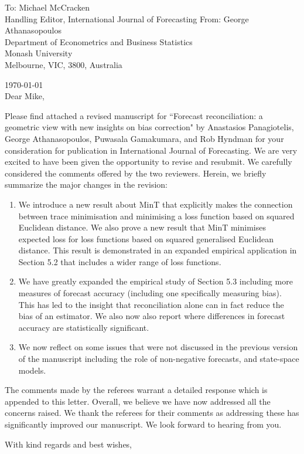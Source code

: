 \documentclass[11pt,a4paper]{letter}
\date{}
\begin{document}
 \begin{letter}{To: Michael McCracken\\
 	Handling Editor, International Journal of Forecasting
    }
    From: George Athanasopoulos\\
    Department of Econometrics and Business Statistics\\
    Monash University\\
    Melbourne, VIC, 3800, Australia

 \opening{\today\ \\Dear Mike,}
 \medskip

Please find attached a revised manuscript for ``Forecast reconciliation: a geometric view with new insights on bias correction" by Anastasios Panagiotelis, George Athanasopoulos, Puwasala Gamakumara, and Rob Hyndman for your consideration for publication in International Journal of Forecasting. We are very excited to have been given the opportunity to revise and resubmit. We carefully considered the comments offered by the two reviewers. Herein, we briefly summarize the major changes in the revision:
\begin{enumerate}
	\item We introduce a new result about MinT that explicitly makes the connection between trace minimisation and minimising a loss function based on squared Euclidean distance. We also prove a new result that MinT minimises expected loss for loss functions based on squared generalised Euclidean distance.  This result is demonstrated in an expanded empirical application in Section 5.2 that includes a wider range of loss functions.
	\item We have greatly expanded the empirical study of Section 5.3 including more measures of forecast accuracy (including one specifically measuring bias). This has led to the insight that reconciliation alone can in fact reduce the bias of an estimator. We also now also report where differences in forecast accuracy are statistically significant.
	\item We now reflect on some issues that were not discussed in the previous version of the manuscript including the role of non-negative forecasts, and state-space models.
\end{enumerate}

The comments made by the referees warrant a detailed response which is appended to this letter. Overall, we believe we have now addressed all the concerns raised. We thank the referees for their comments as addressing these has significantly improved our manuscript. We look forward to hearing from you.

 \closing{With kind regards and best wishes,}

 \end{letter}
\end{document}
